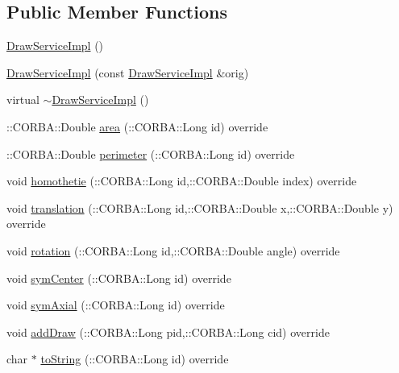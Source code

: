 \subsection*{Public Member Functions}
\begin{DoxyCompactItemize}
\item 
\hyperlink{class_draw_service_impl_a87d912a8f00ffa723cb8f53431f5266b}{Draw\+Service\+Impl} ()
\item 
\hyperlink{class_draw_service_impl_aba8a8c89630f768c86934aa551bd7632}{Draw\+Service\+Impl} (const \hyperlink{class_draw_service_impl}{Draw\+Service\+Impl} \&orig)
\item 
virtual \hyperlink{class_draw_service_impl_a3531c121d4fafaad26c3768397e9ba80}{$\sim$\+Draw\+Service\+Impl} ()
\item 
\+::C\+O\+R\+B\+A\+::\+Double \hyperlink{class_draw_service_impl_a20bbe30191a183eff973b0d3122f2c8c}{area} (\+::C\+O\+R\+B\+A\+::\+Long id) override
\item 
\+::C\+O\+R\+B\+A\+::\+Double \hyperlink{class_draw_service_impl_a137cc7ebfafc7bb133396a59a47e0cad}{perimeter} (\+::C\+O\+R\+B\+A\+::\+Long id) override
\item 
void \hyperlink{class_draw_service_impl_a2ded991472f1d2e1afab3a475360e070}{homothetie} (\+::C\+O\+R\+B\+A\+::\+Long id,\+::C\+O\+R\+B\+A\+::\+Double index) override
\item 
void \hyperlink{class_draw_service_impl_a0b11a8d94d84c97a00de63873370e932}{translation} (\+::C\+O\+R\+B\+A\+::\+Long id,\+::C\+O\+R\+B\+A\+::\+Double x,\+::C\+O\+R\+B\+A\+::\+Double y) override
\item 
void \hyperlink{class_draw_service_impl_a01fab41862413e70cd171883c36056a7}{rotation} (\+::C\+O\+R\+B\+A\+::\+Long id,\+::C\+O\+R\+B\+A\+::\+Double angle) override
\item 
void \hyperlink{class_draw_service_impl_a6d464f4798e45309ce29c69a60a04d2d}{sym\+Center} (\+::C\+O\+R\+B\+A\+::\+Long id) override
\item 
void \hyperlink{class_draw_service_impl_aa2aa750626c52f3e00056216e854e09e}{sym\+Axial} (\+::C\+O\+R\+B\+A\+::\+Long id) override
\item 
void \hyperlink{class_draw_service_impl_a9e4fe6a245439b112c5985682d759fb2}{add\+Draw} (\+::C\+O\+R\+B\+A\+::\+Long pid,\+::C\+O\+R\+B\+A\+::\+Long cid) override
\item 
char $\ast$ \hyperlink{class_draw_service_impl_ae22a80ed71105e8cca0b664d6f384866}{to\+String} (\+::C\+O\+R\+B\+A\+::\+Long id) override
\end{DoxyCompactItemize}



